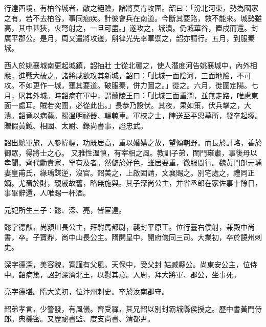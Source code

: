 \begin{pinyinscope}
 行達西境，有柏谷城者，敵之絕險，諸將莫肯攻圍。韶曰：「汾北河東，勢為國家之有，若不去柏谷，事同痼疾。計彼會兵在南道。今斷其要路，救不能來。城勢雖高，其中甚狹，火弩射之，一旦可盡。」遂攻之，城潰。仍城華谷，置戍而還。封廣平郡公。是月，周又遣將攻邊，斛律光先率軍禦之，韶亦請行。五月，到服秦城。



 西人於姚襄城南更起城鎮，韶抽壯
 士從北襲之，使人潛度河告姚襄城中，內外相應，進戰大破之。諸將咸欲攻其新城，韶曰：「此城一面陰河，三面地險，不可攻。不如更作一城，壅其要道。破服秦，併力圖之。」從之。六月，徙圍定陽。七月，屠其外城。時韶病在軍中，謂蘭陵王曰：「此城三面重澗，並無走路，唯慮東面一處耳。賊若突圍，必從此出。」長恭乃設伏。其夜，果如策，伏兵擊之，大潰。韶竟以病薨。賜溫明祕器、轀輬車。軍校之士，陣送至平恩墓所，發卒起塚。贈假黃鉞、相國、太尉、錄尚書事，謚忠武。



 韶出總軍旅，入參幃幄，功既居高，重以婚媾之故，望傾朝野。而長於計略，善於御眾，得將士之心。
 又雅性溫慎，有宰相之風。教訓子弟，閨門雍肅，事後母以孝聞。齊代勳貴家，罕有及者。然僻於好色，雖居要重，微服間行。魏黃門郎元瑀妻皇甫氏，緣瑀謀逆，沒官。韶美之，上啟固請，文襄賜之。別宅處之，禮同正嫡。尤嗇於財，親戚故舊，略無施與。其子深尚公主，并省丞郎在家佐事十餘日，事畢辭還，人唯賜一杯酒。



 元妃所生三子：懿、深、亮，皆宦達。



 懿字德猷，尚潁川長公主，拜駙馬都尉，襲封平原王。位行臺右僕射，兼殿中尚書，卒。子寶鼎，尚中山長公主。隋開皇中，開府儀同三司。大業初，卒於饒州刺史。



 深字德深，美容貌，寬謹有父風。天保中，受父封
 姑臧縣公。尚東安公主，位侍中。韶病篤，詔封深濟北王，以慰其意。入周，拜大將軍、郡公，坐事死。



 亮字德堪。隋大業初，位汴州刺史。卒於汝南郡守。



 韶弟孝言，少警發，有風儀。齊受禪，其兄韶以別封霸城縣侯授之。歷中書黃門侍郎。典機密。又歷祕書監、度支尚書、清都尹。




\end{pinyinscope}
